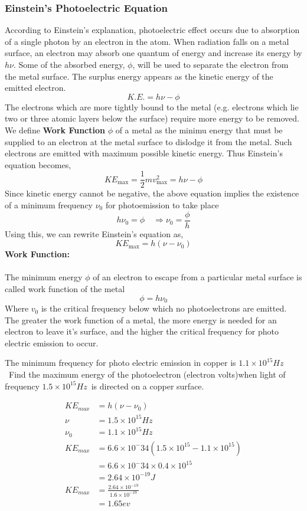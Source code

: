 \subsubsection{Einstein's Photoelectric Equation }
According to Einstein's explanation, photoelectric effect occurs due to absorption of a single photon by an electron in the atom. When radiation falls on a metal surface, an electron may absorb one quantum of energy and increase its energy by $h \nu $.  Some of the absorbed energy, $\phi$, will be used to separate the electron from the metal surface. The surplus energy appears as the kinetic energy of the emitted electron.
$$
K . E .=h \nu-\phi
$$
The electrons which are more tightly bound to the metal (e.g. electrons which lie two or three atomic layers below the surface) require more energy to be removed. We define \textbf{Work Function} $\phi$ of a metal as the
minimu energy that must be supplied to an electron at the metal surface to dislodge it from the metal.  Such electrons are emitted with maximum possible kinetic energy. Thus Einstein's equation becomes,
$$
KE_{\max }=\frac{1}{2} m v_{\max }^{2}=h \nu-\phi
$$
Since kinetic energy cannot be negative, the above equation implies the existence of a minimum frequency $\nu_{0}$ for photoemission to take place
$$
h \nu_{0}=\phi \quad \Rightarrow {\nu }_{0}=\frac{\phi}{h}
$$
Using this, we can  rewrite Einstein's equation as,
$$
KE_{\max }=h\left(\nu-\nu_{0}\right)
$$
\textbf{Work Function:}\\\\
The minimum energy $\phi$ of an electron to escape from a particular metal surface is called work function of the metal 
$$\phi=h\nu_0$$
Where $v_0$ is the critical frequency below which no photoelectrons are emitted. The greater the work function of a metal, the more energy is needed for an electron to leave it's surface, and the higher the critical frequency for photo electric emission to occur.
\begin{exercise}
	The minimum frequency for photo electric emission in copper is $1.1\times10^{15} Hz$ \ Find the maximum energy of the photoelectron (electron volts)when light of frequency $1.5\times10^{15} Hz$\  is directed on a copper surface.
\end{exercise}
\begin{answer}
	\begin{align*}
	KE_{max}&=h(\nu-\nu_0)\\
	\nu&=1.5\times10^{15} Hz\\
	\nu_0&=1.1\times10^{15} Hz\\
	KE_{max}&=6.6\times10^-34(1.5\times10^{15}-1.1\times10^{15})\\
	&=6.6\times10^-34\times0.4\times10^{15}\\
	&=2.64\times10^{-19} J\\
	KE_{max}&=\frac{2.64\times10^{-19}}{1.6\times10^{-19}}\\
	&=1.65ev
	\end{align*}
\end{answer}
